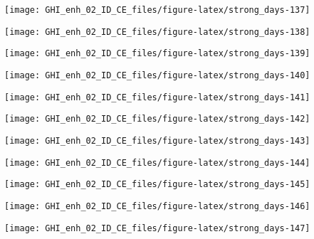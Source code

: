 \documentclass[
  10pt,
  a4paper,oneside]{article}
\begin{document}
\begin{center}\texttt{[image: GHI\_enh\_02\_ID\_CE\_files/figure-latex/strong\_days-137]} \end{center}

\begin{center}\texttt{[image: GHI\_enh\_02\_ID\_CE\_files/figure-latex/strong\_days-138]} \end{center}

\begin{center}\texttt{[image: GHI\_enh\_02\_ID\_CE\_files/figure-latex/strong\_days-139]} \end{center}

\begin{center}\texttt{[image: GHI\_enh\_02\_ID\_CE\_files/figure-latex/strong\_days-140]} \end{center}

\begin{center}\texttt{[image: GHI\_enh\_02\_ID\_CE\_files/figure-latex/strong\_days-141]} \end{center}

\begin{center}\texttt{[image: GHI\_enh\_02\_ID\_CE\_files/figure-latex/strong\_days-142]} \end{center}

\begin{center}\texttt{[image: GHI\_enh\_02\_ID\_CE\_files/figure-latex/strong\_days-143]} \end{center}

\begin{center}\texttt{[image: GHI\_enh\_02\_ID\_CE\_files/figure-latex/strong\_days-144]} \end{center}

\begin{center}\texttt{[image: GHI\_enh\_02\_ID\_CE\_files/figure-latex/strong\_days-145]} \end{center}

\begin{center}\texttt{[image: GHI\_enh\_02\_ID\_CE\_files/figure-latex/strong\_days-146]} \end{center}

\begin{center}\texttt{[image: GHI\_enh\_02\_ID\_CE\_files/figure-latex/strong\_days-147]} \end{center}
\end{document}
